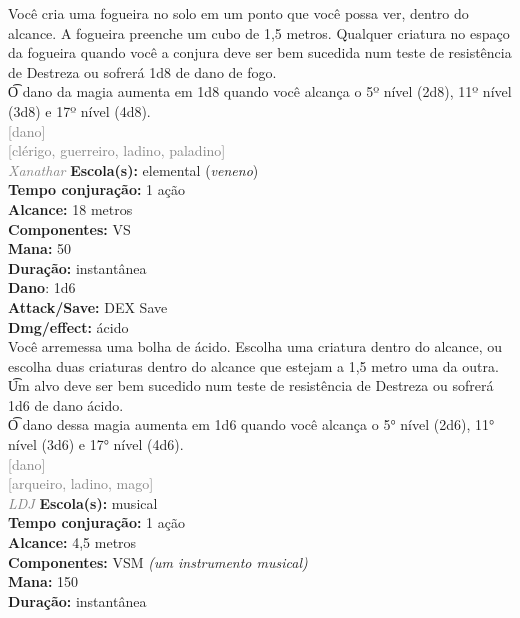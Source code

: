 \documentclass{RPG_Adventure}[2021/10/20]
\begin{document}
{\normalsize Você cria uma fogueira no solo em um ponto que você possa ver, dentro do alcance. A fogueira preenche um cubo de 1,5 metros. Qualquer criatura no espaço da fogueira quando você a conjura deve ser bem sucedida num teste de resistência de Destreza ou sofrerá 1d8 de dano de fogo.\\\t O dano da magia aumenta em 1d8 quando você alcança o 5º nível (2d8), 11º nível (3d8) e 17º nível (4d8).\\}
{\scriptsize \textcolor{gray}{[dano]\\}}
{\scriptsize \textcolor{gray}{[clérigo, guerreiro, ladino, paladino]\\}}
{\tiny \textcolor{gray}{\textit{Xanathar}}}\jump{}
{\small \t \textbf{Escola(s):} elemental (\textit{veneno})\\\t \textbf{Tempo conjuração:} 1 ação\\\t \textbf{Alcance:} 18 metros\\\t \textbf{Componentes:} VS\\\t \textbf{Mana:} 50\\\t \textbf{Duração:} instantânea\\\t \textbf{Dano}: 1d6\\\t \textbf{Attack/Save:} DEX Save\\\t \textbf{Dmg/effect:} ácido\\}
{\normalsize Você arremessa uma bolha de ácido. Escolha uma criatura dentro do alcance, ou escolha duas criaturas dentro do alcance que estejam a 1,5 metro uma da outra.\\\t Um alvo deve ser bem sucedido num teste de resistência de Destreza ou sofrerá 1d6 de dano ácido.\\\t O dano dessa magia aumenta em 1d6 quando você alcança o 5° nível (2d6), 11° nível (3d6) e 17° nível (4d6).\\}
{\scriptsize \textcolor{gray}{[dano]\\}}
{\scriptsize \textcolor{gray}{[arqueiro, ladino, mago]\\}}
{\tiny \textcolor{gray}{\textit{LDJ}}}\jump{}
{\small \t \textbf{Escola(s):} musical\\\t \textbf{Tempo conjuração:} 1 ação\\\t \textbf{Alcance:} 4,5 metros\\\t \textbf{Componentes:} VSM \textit{(um instrumento musical)}\\\t \textbf{Mana:} 150\\\t \textbf{Duração:} instantânea\\}
\end{document}
